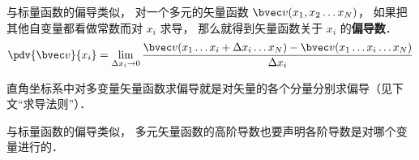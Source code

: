 
\begin{issues}
\issueDraft
\end{issues}

与标量函数的偏导类似， 对一个多元的矢量函数 $\bvec v(x_1, x_2\ldots x_N)$， 如果把其他自变量都看做常数而对 $x_i$ 求导， 那么就得到矢量函数关于 $x_i$ 的\textbf{偏导数}．
\begin{equation}
\pdv{\bvec v}{x_i} = \lim_{\Delta x_i \to 0} \frac{\bvec v(x_1 \ldots x_i+\Delta x_i\ldots x_N) -  \bvec v(x_1 \ldots x_i\ldots x_N)}{\Delta x_i}
\end{equation}

直角坐标系中对多变量矢量函数求偏导就是对矢量的各个分量分别求偏导（见下文“求导法则”）．


与标量函数的偏导类似， 多元矢量函数的高阶导数也要声明各阶导数是对哪个变量进行的．
